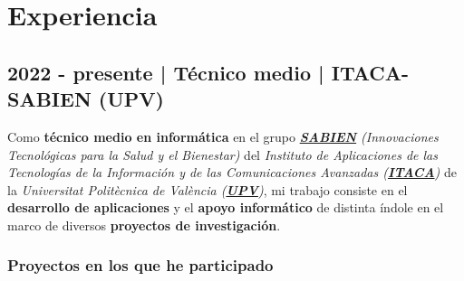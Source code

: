 \documentclass[letterpaper, 12pt, dvipsnames]{article}
\newcommand{\uniFull}{Universitat Politècnica de València}
\newcommand{\uniUrl}{https://www.upv.es/es}
\newcommand{\sabienUrl}{http://www.sabien.upv.es/}
\begin{document}
\begin{adjustwidth}{-1.5cm}{}
\end{adjustwidth}

\pagebreak

\section*{Experiencia}

\subsection*{2022 - presente | Técnico medio | ITACA-SABIEN (UPV)}

Como \textbf{técnico medio en informática} en el grupo \emph{\textbf{\href{\sabienUrl}{SABIEN}} (Innovaciones Tecnológicas para la Salud y el Bienestar)} del \emph{Instituto de Aplicaciones de las Tecnologías de la Información y de las Comunicaciones Avanzadas (\textbf{\href{http://www.itaca.upv.es/}{ITACA}})} de la \emph{{\uniFull} (\textbf{\href{\uniUrl}{UPV}})}, mi trabajo consiste en el \textbf{desarrollo de aplicaciones} y el \textbf{apoyo informático} de distinta índole en el marco de diversos \textbf{proyectos de investigación}.

\subsubsection*{Proyectos en los que he participado}
\end{document}
